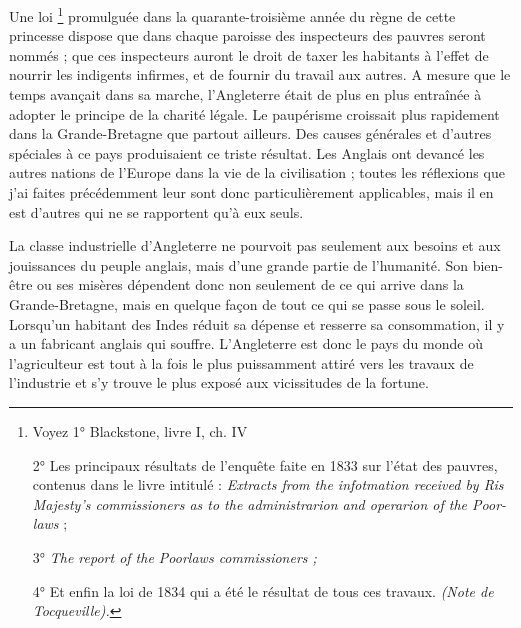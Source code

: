 \documentclass[french,twoside]{book} %
\begin{document}
Une loi \footnote{\noindent Voyez 1° Blackstone, livre I, ch. IV\par
2° Les principaux résultats de l’enquête faite en 1833 sur l’état des pauvres, contenus dans le livre intitulé : \emph{Extracts from the infotmation received by Ris Majesty's commissioners as to the administrarion and operarion of the Poor-laws} ;\par
3° \emph{The report of the Poorlaws commissioners ;}\par
4° Et enfin la loi de 1834 qui a été le résultat de tous ces travaux. \emph{(Note de Tocqueville).}
} promulguée dans la quarante-troisième année du règne de cette princesse dispose que dans chaque paroisse des inspecteurs des pauvres seront nommés ; que ces inspecteurs auront le droit de taxer les habitants à l’effet de nourrir les indigents infirmes, et de fournir du travail aux autres. A mesure que le temps avançait dans sa marche, l’Angleterre était de plus en plus entraînée à adopter le principe de la charité légale. Le paupérisme croissait plus rapidement dans la Grande-Bretagne que partout ailleurs. Des causes générales et d’autres spéciales à ce pays produisaient ce triste résultat. Les Anglais ont devancé les autres nations de l’Europe dans la vie de la civilisation ; toutes les réflexions que j’ai faites précédemment leur sont donc particulièrement applicables, mais il en est d’autres qui ne se rapportent qu’à eux seuls.\par
La classe industrielle d’Angleterre ne pourvoit pas seulement aux besoins et aux jouissances du peuple anglais, mais d’une grande partie de l’humanité. Son bien-être ou ses misères dépendent donc non seulement de ce qui arrive dans la Grande-Bretagne, mais en quelque façon de tout ce qui se passe sous le soleil. Lorsqu’un habitant des Indes réduit sa dépense et resserre sa consommation, il y a un fabricant anglais qui souffre. L’Angleterre est donc le pays du monde où l’agriculteur est tout à la fois le plus puissamment attiré vers les travaux de l’industrie et s’y trouve le plus exposé aux vicissitudes de la fortune.\par
\end{document}
